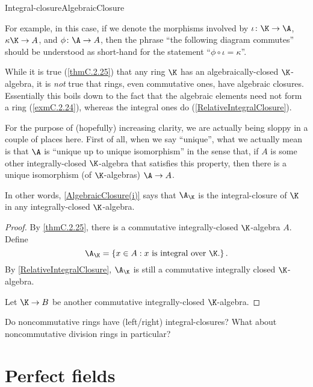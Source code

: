 \begin{thm}{Integral-closure}{AlgebraicClosure}
\begin{rmk}
		For example, in this case, if we denote the morphisms involved by $\iota \colon \K \rightarrow \A$, $\kappa \K \rightarrow A$, and $\phi \colon \A \rightarrow A$, then the phrase ``the following diagram commutes'' should be understood as short-hand for the statement ``$\phi \circ \iota =\kappa$''.
	\end{rmk}
	\begin{rmk}
		While it is true (\cref{thmC.2.25}) that any ring $\K$ has an algebraically-closed $\K$-algebra, it is \emph{not} true that rings, even commutative ones, have algebraic closures.  Essentially this boils down to the fact that the algebraic elements need not form a ring (\cref{exmC.2.24}), whereas the integral ones do (\cref{RelativeIntegralClosure}).
	\end{rmk}
	\begin{rmk}
		For the purpose of (hopefully) increasing clarity, we are actually being sloppy in a couple of places here.  First of all, when we say ``unique'', what we actually mean is that $\A$ is ``unique up to unique isomorphism'' in the sense that, if $A$ is some other integrally-closed $\K$-algebra that satisfies this property, then there is a unique isomorphism (of $\K$-algebras) $\A \rightarrow A$.
	\end{rmk}
	\begin{rmk}
		In other words, \cref{AlgebraicClosure(i)} says that $\A _{\K}$ is the integral-closure of $\K$ in any integrally-closed $\K$-algebra.
	\end{rmk}
	\begin{proof}
		By \cref{thmC.2.25}, there is a commutative integrally-closed $\K$-algebra $A$.  Define
		\begin{equation}
			\A _{\K}=\left\{ x\in A:x\text{ is integral over }\K \text{.}\right\} .
		\end{equation}
		By \cref{RelativeIntegralClosure}, $\A _{\K}$ is still a commutative integrally closed $\K$-algebra.
		
		Let $\K \rightarrow B$ be another commutative integrally-closed $\K$-algebra.
	\end{proof}
\end{thm}
\begin{exr}{}{}
	Do noncommutative rings have (left/right) integral-closures?  What about noncommutative division rings in particular?  
\end{exr}

\section{Perfect fields}

